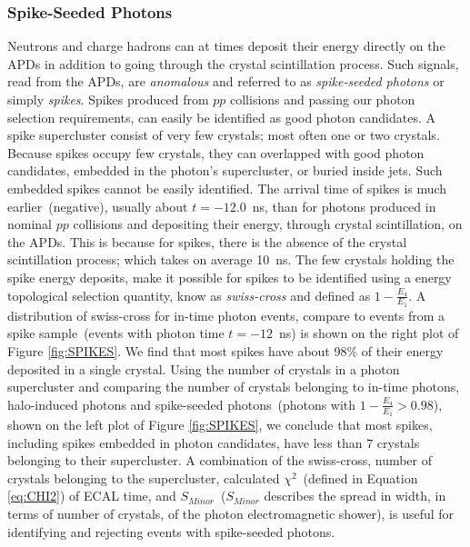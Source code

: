 \subsubsection{Spike-Seeded Photons}
Neutrons and charge hadrons can at times deposit their energy directly on the APDs in addition to  going through the crystal scintillation process. Such signals, read from the APDs, are \textit{anomalous} and referred to as \textit{spike-seeded photons} or simply \textit{spikes}. Spikes produced from $pp$ collisions and passing our photon selection requirements, can easily be identified as good photon candidates. A spike supercluster consist of very few crystals; most often one or two crystals. Because spikes occupy few crystals, they can overlapped with good photon candidates, embedded in the photon's supercluster, or buried inside jets. Such embedded spikes cannot be easily identified. 
\newline
The arrival time of spikes is much earlier~(negative), usually about $t = -12.0$~ns, than for photons produced in nominal $pp$ collisions and depositing their energy, through crystal scintillation, on the APDs. This is because for spikes, there is the absence of the crystal scintillation process; which takes on average 10~ns. The few crystals holding the spike energy deposits, make it possible for spikes to be identified using a energy topological selection quantity, know as \textit{swiss-cross} and defined as  $1-\frac{E_{4}}{E_{1}}$. A distribution of swiss-cross for in-time photon events, compare to events from a spike sample~(events with photon time $t = -12$~ns) is shown on the right plot of Figure \ref{fig:SPIKES}. We find that most spikes have about 98\% of their energy deposited in a single crystal.
\newline
Using the number of crystals in a photon supercluster and comparing the number of crystals belonging to in-time photons, halo-induced photons and spike-seeded photons~(photons with $1-\frac{E_{4}}{E_{1}} > 0.98$), shown on the left plot of Figure \ref{fig:SPIKES}, we conclude that most spikes, including spikes embedded in photon candidates, have less than $7$ crystals belonging to their supercluster. A combination of the swiss-cross, number of crystals belonging to the supercluster, calculated $\chi^{2}$~(defined in Equation \ref{eq:CHI2}) of ECAL time, and $ S_{Minor}$~($ S_{Minor}$ describes the spread in width, in terms of number of crystals, of the photon electromagnetic shower), is useful for identifying and rejecting events with spike-seeded photons.

